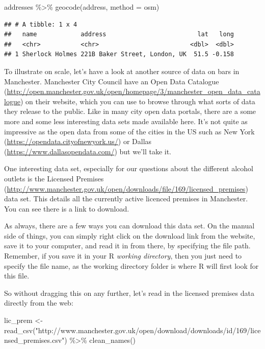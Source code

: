 \documentclass[
]{book}
\newenvironment{Shaded}{\begin{snugshade}}{\end{snugshade}}
\newcommand{\AttributeTok}[1]{\textcolor[rgb]{0.77,0.63,0.00}{#1}}
\newcommand{\FunctionTok}[1]{\textcolor[rgb]{0.00,0.00,0.00}{#1}}
\newcommand{\NormalTok}[1]{#1}
\newcommand{\OtherTok}[1]{\textcolor[rgb]{0.56,0.35,0.01}{#1}}
\newcommand{\SpecialCharTok}[1]{\textcolor[rgb]{0.00,0.00,0.00}{#1}}
\newcommand{\StringTok}[1]{\textcolor[rgb]{0.31,0.60,0.02}{#1}}
\begin{document}
\begin{Shaded}
\begin{Highlighting}[]
\NormalTok{addresses }\SpecialCharTok{\%\textgreater{}\%} 
  \FunctionTok{geocode}\NormalTok{(address, }\AttributeTok{method =} \StringTok{\textquotesingle{}osm\textquotesingle{}}\NormalTok{)}
\end{Highlighting}
\end{Shaded}

\begin{verbatim}
## # A tibble: 1 x 4
##   name            address                         lat   long
##   <chr>           <chr>                         <dbl>  <dbl>
## 1 Sherlock Holmes 221B Baker Street, London, UK  51.5 -0.158
\end{verbatim}

To illustrate on scale, let's have a look at another source of data on bars in Manchester. Manchester City Council have an Open Data Catalogue (\url{http://open.manchester.gov.uk/open/homepage/3/manchester_open_data_catalogue}) on their website, which you can use to browse through what sorts of data they release to the public. Like in many city open data portals, there are a some more and some less interesting data sets made available here. It's not quite as impressive as the open data from some of the cities in the US such as New York (\url{https://opendata.cityofnewyork.us/}) or Dallas (\url{https://www.dallasopendata.com/}) but we'll take it.

One interesting data set, especially for our questions about the different alcohol outlets is the Licensed Premises (\url{http://www.manchester.gov.uk/open/downloads/file/169/licensed_premises}) data set. This details all the currently active licenced premises in Manchester. You can see there is a link to download.

As always, there are a few ways you can download this data set. On the manual side of things, you can simply right click on the download link from the website, save it to your computer, and read it in from there, by specifying the file path. Remember, if you save it in your R \emph{working directory}, then you just need to specify the file name, as the working directory folder is where R will first look for this file.

So without dragging this on any further, let's read in the licensed premises data directly from the web:

\begin{Shaded}
\begin{Highlighting}[]
\NormalTok{lic\_prem }\OtherTok{\textless{}{-}} \FunctionTok{read\_csv}\NormalTok{(}\StringTok{"http://www.manchester.gov.uk/open/download/downloads/id/169/licensed\_premises.csv"}\NormalTok{) }\SpecialCharTok{\%\textgreater{}\%} \FunctionTok{clean\_names}\NormalTok{()}
\end{Highlighting}
\end{Shaded}
\end{document}
